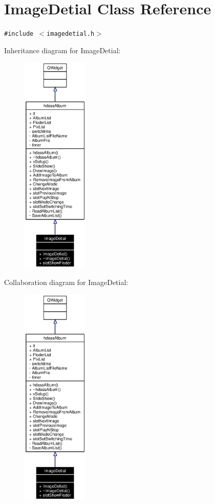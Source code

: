 \section{Image\-Detial Class Reference}
\label{classImageDetial}
{\tt \#include $<$imagedetial.h$>$}

Inheritance diagram for Image\-Detial:\begin{figure}[H]
\begin{center}
\leavevmode
\includegraphics[width=89pt]{classImageDetial__inherit__graph}
\end{center}
\end{figure}
Collaboration diagram for Image\-Detial:\begin{figure}[H]
\begin{center}
\leavevmode
\includegraphics[width=89pt]{classImageDetial__coll__graph}
\end{center}
\end{figure}


